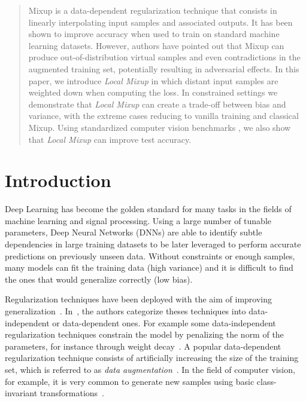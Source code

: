 \documentclass[twoside]{article}
\numberwithin{intassumption}{assumption}
\begin{document}

\begin{abstract}

Mixup is a data-dependent regularization technique that consists in linearly interpolating input samples and associated outputs. It has been shown to improve accuracy when used to train on standard machine learning datasets. However, authors have pointed out that Mixup can produce out-of-distribution virtual samples and even contradictions in the augmented training set, potentially resulting in adversarial effects. In this paper, we introduce \emph{Local Mixup} in which distant input samples are weighted down when computing the loss. In constrained settings we demonstrate that \emph{Local Mixup} can create a trade-off between bias and variance, with the extreme cases reducing to vanilla training and classical Mixup. Using standardized computer vision benchmarks , we also show that \emph{Local Mixup} can improve test accuracy.

\end{abstract}

\section{Introduction}

Deep Learning has become the golden standard for many tasks in the fields of machine learning and signal processing. Using a large number of tunable parameters, Deep Neural Networks (DNNs) are able to identify subtle dependencies in large training datasets to be later leveraged to perform accurate predictions on previously unseen data. Without constraints or enough samples, many models can fit the training data (high variance) and it is difficult to find the ones that would generalize correctly (low bias).

Regularization techniques have been deployed with the aim of improving generalization~\citep{goodfellow2016deep}. In~\citep{guo2019mixup}, the authors categorize theses techniques into data-independent or data-dependent ones. For example some data-independent regularization techniques constrain the model by penalizing the norm of the parameters, for instance through weight decay~\citep{weightdecay}. A popular data-dependent regularization technique consists of artificially increasing the size of the training set, which is referred to as \emph{data augmentation}~\citep{dataaugmentation}. In the field of computer vision, for example, it is very common to generate new samples using basic class-invariant transformations~\citep{horizontalflip,horizontalflip3}. 
\end{document}
